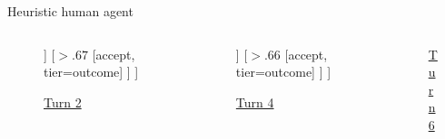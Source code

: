 \documentclass[aspectratio=169]{beamer}
\begin{document}
\begin{frame}[t]{Heuristic human agent}
\begin{columns}
    \begin{column}[t]{0.33\linewidth}
    \begin{figure}
    \caption*{\underline{Turn 2}}
    \begin{forest}
	[$\texttt{offer}_1$
    	[$\le .67$ 
    		[counter, tier=outcome] 
    	]
    	[$>.67$ 
    		[accept, tier=outcome] 
		] 
	]
	\end{forest}
    \end{figure}
	\end{column}

    \begin{column}[t]{0.33\linewidth}
    \begin{figure}
    \caption*{\underline{Turn 4}}
    \begin{forest}
	[$\texttt{offer}_1$
    	[$\le .66$ 
    		[counter, tier=outcome]
    	]
    	[$>.66$ 
    		[accept, tier=outcome]
		] 
	]
	\end{forest}
    \end{figure}
    \end{column}
    
    \begin{column}[t]{0.33\linewidth}
	\begin{figure}
    \caption*{\underline{Turn 6}}
    \begin{forest}
	[accept]
	\end{forest}
    \end{figure}    
    \end{column}
\end{columns}
\end{frame}


\end{document}
